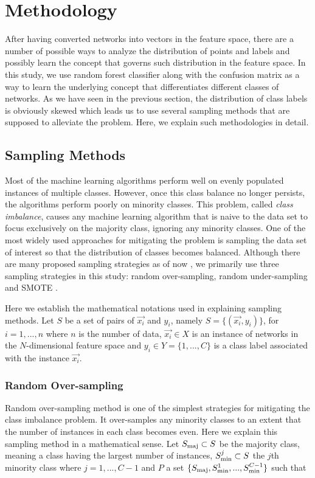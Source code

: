 \section*{Methodology}
After having converted networks into vectors in the feature space, there are a number of possible ways to analyze the distribution of points and labels and possibly learn the concept that governs such distribution in the feature space. In this study, we use random forest classifier along with the confusion matrix as a way to learn the underlying concept that differentiates different classes of networks. As we have seen in the previous section, the distribution of class labels is obviously skewed which leads us to use several sampling methods that are supposed to alleviate the problem. Here, we explain such methodologies in detail.

	\subsection*{Sampling Methods}
Most of the machine learning algorithms perform well on evenly populated instances of multiple classes. However, once this class balance no longer persists, the algorithms perform poorly on minority classes. This problem, called \textit{class imbalance}, causes any machine learning algorithm that is naive to the data set to focus exclusively on the majority class, ignoring any minority classes. One of the most widely used approaches for mitigating the problem is sampling the data set of interest so that the distribution of classes becomes balanced. Although there are many proposed sampling strategies as of now \cite{SurveySampling}, we primarily use three sampling strategies in this study: random over-sampling, random under-sampling and SMOTE \cite{SMOTE}.

 Here we establish the mathematical notations used in explaining sampling methods. Let $S$ be a set of pairs of $\vec{x_i}$ and $y_i$, namely $S =\{(\vec{x_i},y_i)\}$, for $i = 1,...,n$ where $n$ is the number of data, $\vec{x_i} \in X$ is an instance of networks in the $N$-dimensional feature space and $y_i \in Y = \{1,...,C\}$ is a class label associated with the instance $\vec{x_i}$.   


		\subsubsection*{Random Over-sampling}
		Random over-sampling method is one of the simplest strategies for mitigating the class imbalance problem. It over-samples any minority classes to an extent that the number of instances in each class becomes even. Here we explain this sampling method in a mathematical sense. Let $S_{\rm{maj}} \subset S$ be the majority class, meaning a class having the largest number of instances, $S_{\rm{min}}^{j} \subset S$ the $j$th minority class where $j = 1,...,C-1$ and $P$ a set $\{S_{\rm{maj}}, S_{\rm{min}}^{1},...,S_{\rm{min}}^{C-1} \}$ such that
	
